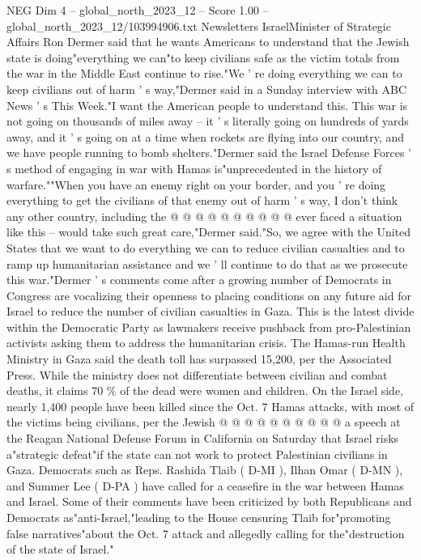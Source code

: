 \begin{textsample}{NEG Dim 4 – global\_north\_2023\_12 – Score 1.00 – global\_north\_2023\_12/103994906.txt}  \label{ex:f4_neg_159}
Newsletters IsraelMinister of Strategic Affairs Ron Dermer said that he wants Americans to understand that the Jewish state is doing"everything we can"to keep civilians safe as the victim totals from the war in the Middle East continue to rise."We ' re doing everything we can to keep civilians out of harm ' s way,"Dermer said in a Sunday interview with ABC News ' s This Week."I want the American people to understand this.
This war is not going on thousands of miles away -- it ' s literally going on hundreds of yards away, and it ' s going on at a time when rockets are flying into our country, and we have people running to bomb shelters."Dermer said the Israel Defense Forces ' s method of engaging in war with Hamas is"unprecedented in the history of warfare.""When you have an enemy right on your border, and you ' re doing everything to get the civilians of that enemy out of harm ' s way, I don't think any other country, including the @ @ @ @ @ @ @ @ @ @ ever faced a situation like this -- would take such great care,"Dermer said."So, we agree with the United States that we want to do everything we can to reduce civilian casualties and to ramp up humanitarian assistance and we ' ll continue to do that as we prosecute this war."Dermer ' s comments come after a growing number of Democrats in Congress are vocalizing their openness to placing conditions on any future aid for Israel to reduce the number of civilian casualties in Gaza.
This is the latest divide within the Democratic Party as lawmakers receive pushback from pro-Palestinian activists asking them to address the humanitarian crisis.
The Hamas-run Health Ministry in Gaza said the death toll has surpassed 15,200, per the Associated Press.
While the ministry does not differentiate between civilian and combat deaths, it claims 70 \% of the dead were women and children.
On the Israel side, nearly 1,400 people have been killed since the Oct. 7 Hamas attacks, with most of the victims being civilians, per the Jewish @ @ @ @ @ @ @ @ @ @ a speech at the Reagan National Defense Forum in California on Saturday that Israel risks a"strategic defeat"if the state can not work to protect Palestinian civilians in Gaza.
Democrats such as Reps.
Rashida Tlaib ( D-MI ), Ilhan Omar ( D-MN ), and Summer Lee ( D-PA ) have called for a ceasefire in the war between Hamas and Israel.
Some of their comments have been criticized by both Republicans and Democrats as"anti-Israel,"leading to the House censuring Tlaib for"promoting false narratives"about the Oct. 7 attack and allegedly calling for the"destruction of the state of Israel."

\end{textsample}
